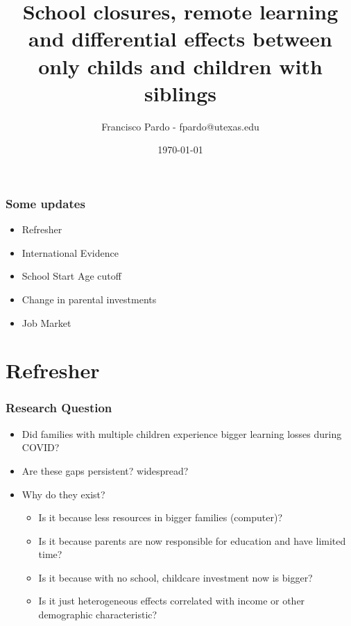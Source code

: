 \documentclass{beamer}
\title[]{School closures, remote learning and differential effects between only childs and children with siblings}
\author[Francisco Pardo] %
{Francisco Pardo - fpardo@utexas.edu \inst{1}}
\institute[UT] %
{
  \inst{1}%
  University of Texas at Austin
}
\date{\today}
\begin{document}
\frame{\titlepage}


\begin{frame}
    \label{update_scott}
    \frametitle{Some updates}
    \begin{itemize}
        \item Refresher 
        \item International Evidence 
        \item School Start Age cutoff
        \item Change in parental investments
        \item Job Market
    \end{itemize}
\end{frame}

\section{Refresher}

\begin{frame}
    \label{update_scott}
    \frametitle{Research Question}
      \begin{itemize}
          \item Did families with multiple children experience bigger learning losses during COVID? 
          \item Are these gaps persistent? widespread? 
          \item Why do they exist?
          \begin{itemize}
          \item Is it because less resources in bigger families (computer)?
          \item Is it because parents are now responsible for education and have limited time?
          \item Is it because with no school, childcare investment now is bigger?
          \item Is it just heterogeneous effects correlated with income or other demographic characteristic?
          \end{itemize}
      \end{itemize}
\end{frame}
\end{document}
